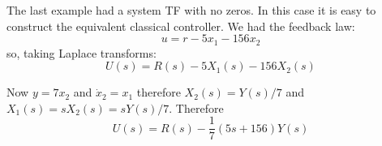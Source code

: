 The last example had a system TF with no zeros. In this case it is easy to construct the equivalent classical controller. We had the feedback law:
\[
u=r-5x_1-156x_2
\]
so, taking Laplace transforms:
\[
U(s) = R(s) - 5X_1(s) - 156X_2(s)
\]

Now $y=7x_2$ and $\dot{x}_2=x_1$ therefore $X_2(s)=Y(s)/7$ and $X_1(s)=sX_2(s)=sY(s)/7$. Therefore
\[
	U(s) =  R(s) - \frac{1}{7}(5s+156)Y(s)
\]

\endinput

